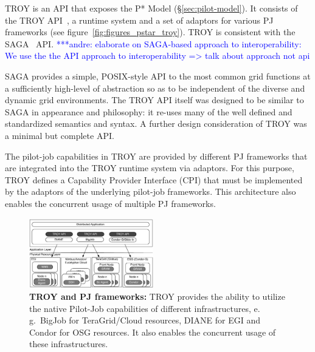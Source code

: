 \documentclass[conference,final]{IEEEtran}
\newcommand{\alnote}[1]{ {\textcolor{blue} { ***andre: #1 }}}
\newcommand{\alnote}[1]{}
\newcommand{\upp}{\vspace*{-0.5em}}
\begin{document}
TROY is an API that exposes the P* Model
(\S\ref{sec:pilot-model}). It consists of the TROY
API~\cite{troy_api}, a runtime system and a set of adaptors for
various PJ frameworks (see figure~\ref{fig:figures_pstar_troy}). TROY
is consistent with the SAGA~\cite{saga_url,saga_gfd90} API. 
\alnote{elaborate on SAGA-based approach to interoperability: We use the the API 
approach to interoperability => talk about approach not api}


SAGA provides a simple, POSIX-style API to the most common grid
functions at a sufficiently high-level of abstraction so as to be
independent of the diverse and dynamic grid environments. The TROY API
itself was designed to be similar to SAGA in appearance and
philosophy: it re-uses many of the well defined and standardized
semantics and syntax. A further design consideration of TROY was a
minimal but complete API.

The pilot-job capabilities in TROY are provided by different PJ
frameworks that are integrated into the TROY runtime system via
adaptors. For this purpose, TROY defines a Capability Provider
Interface (CPI) that must be implemented by the adaptors of the
underlying pilot-job frameworks. This architecture also enables the
concurrent usage of multiple PJ frameworks.

\begin{figure}[t]
    \centering
\upp
    \includegraphics[width=0.48\textwidth]{figures/distributed_pilot_job.pdf}
    \caption{\textbf{TROY and PJ frameworks:} TROY provides the
      ability to utilize the native Pilot-Job capabilities of
      different infrastructures, e.\,g.\ BigJob for TeraGrid/Cloud
      resources, DIANE for EGI and Condor for OSG resources. It also
      enables the concurrent usage of these infrastructures.
	\upp\upp\upp}
    \label{fig:figures_distributed_pilot_job}
\end{figure}

\end{document}
